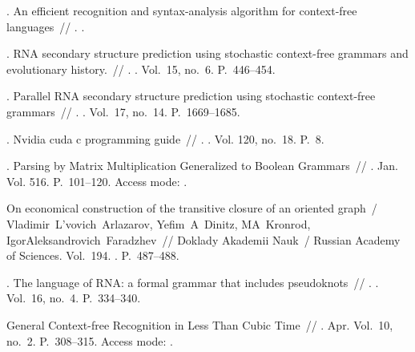 \begin{thebibliography}{10}
. An efficient recognition and syntax-analysis algorithm
  for context-free languages~// . \BibDash
{}.

. RNA secondary structure prediction using
  stochastic context-free grammars and evolutionary history.~//
  . \BibDash
{}. \BibDash
\newblock Vol.~15, no.~6. \BibDash
\newblock P.~446--454.

. Parallel RNA secondary structure prediction
  using stochastic context-free grammars~// . \BibDash
{}. \BibDash
\newblock Vol.~17, no.~14. \BibDash
\newblock P.~1669--1685.

. Nvidia cuda c programming guide~// . \BibDash
{}. \BibDash
\newblock Vol. 120, no.~18. \BibDash
\newblock P.~8.

. Parsing by Matrix Multiplication Generalized to
  Boolean Grammars~//  \BibDash
{}. \BibDash Jan. \BibDash
\newblock Vol. 516. \BibDash
\newblock P.~101--120. \BibDash
\newblock Access mode: .

On economical construction of the transitive closure of an oriented graph~/
  Vladimir~L'vovich~Arlazarov, Yefim~A~Dinitz, MA~Kronrod,
  IgorAleksandrovich~Faradzhev~// Doklady Akademii Nauk~/ Russian Academy of
  Sciences. \BibDash
\newblock Vol.~194. \BibDash
{}. \BibDash
\newblock P.~487--488.

. The language of RNA: a formal grammar that
  includes pseudoknots~// . \BibDash
{}. \BibDash
\newblock Vol.~16, no.~4. \BibDash
\newblock P.~334--340.

 General Context-free Recognition in Less Than Cubic
  Time~//  \BibDash
{}. \BibDash Apr. \BibDash
\newblock Vol.~10, no.~2. \BibDash
\newblock P.~308--315. \BibDash
\newblock Access mode:
  .


\end{thebibliography}
